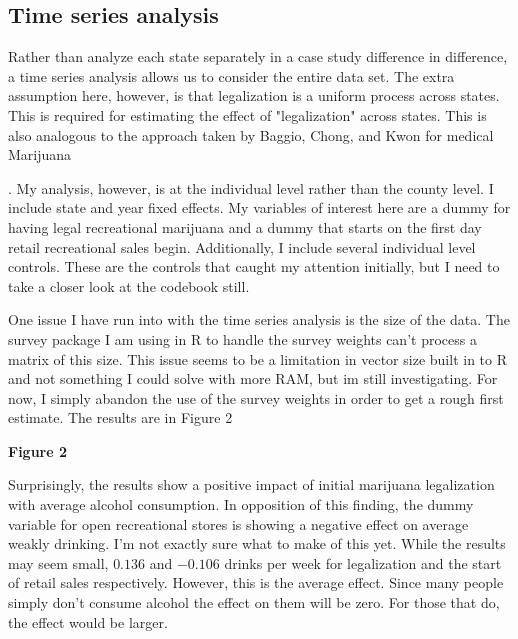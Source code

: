 \documentclass[11pt]{article}
\begin{document}
\subsection{Time series analysis}

Rather than analyze each state separately in a case study difference in difference, a time series analysis allows us to consider the entire data set. The extra assumption here, however, is that legalization is a uniform process across states. This is required for estimating the effect of "legalization" across states. This is also analogous to the approach taken by Baggio, Chong, and Kwon for medical Marijuana \cite{baggio_chong_kwon_2018} \par. My analysis, however, is at the individual level rather than the county level. I include state and year fixed effects.  My variables of interest here are a dummy for having legal recreational marijuana and a dummy that starts on the first day retail recreational sales begin. Additionally, I include several individual level controls. These are the controls that caught my attention initially, but I need to take a closer look at the codebook still.

One issue I have run into with the time series analysis is the size of the data. The survey package I am using in R to handle the survey weights can't process a matrix of this size. This issue seems to be a limitation in vector size built in to R and not something I could solve with more RAM, but im still investigating. For now, I simply abandon the use of the survey weights in order to get a rough first estimate. The results are in Figure 2 \par

\begin{center}

	\centering
	\textbf{Figure 2}\par\medskip
	
\end{center}


Surprisingly, the results show a positive impact of initial marijuana legalization with average alcohol consumption. In opposition of this finding, the dummy variable for open recreational stores is showing a negative effect on average weakly drinking. I'm not exactly sure what to make of this yet. While the results may seem small, $0.136$ and $-0.106$ drinks per week for legalization and the start of retail sales respectively. However, this is the average effect. Since many people simply don't consume alcohol the effect on them will be zero. For those that do, the effect would be larger. 
\end{document}
